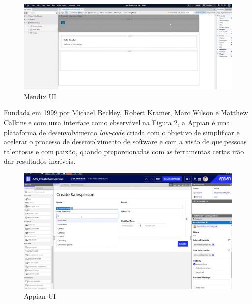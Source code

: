         \begin{figure}[htbp] %
            \centering
            \includegraphics[width=\textwidth]{imgs/MendixUI.png}
            \caption{Mendix UI}\label{fig:mendixui-ui}
        \end{figure}


    \label{secsec:appian}

        Fundada em 1999 por Michael Beckley, Robert Kramer, Marc Wilson e Matthew Calkins e com uma interface como observável na Figura \ref{fig:appian-ui}, a Appian é uma plataforma de desenvolvimento \textit{low-code} criada com o objetivo de simplificar e acelerar o processo de desenvolvimento de software e com a visão de que pessoas talentosas e com paixão, quando proporcionadas com as ferramentas certas irão dar resultados incríveis\cite{appian-company-history,appian-company-overview}. 
    
        \begin{figure}[htbp] %
            \centering
            \includegraphics[width=\textwidth]{imgs/AppianUI.png}
            \caption{Appian UI}\label{fig:appian-ui}
        \end{figure}

